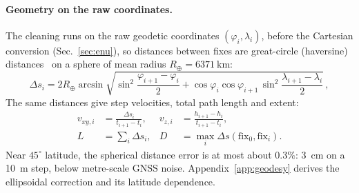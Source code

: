 \paragraph{Geometry on the raw coordinates.}
The cleaning runs on the raw geodetic coordinates $(\varphi_i,\lambda_i)$, before the
Cartesian conversion (Sec.~\ref{sec:enu}), so distances between fixes are great-circle
(haversine) distances~\cite{sklearn_haversine} on a sphere of mean radius
$R_\oplus=\SI{6371}{\kilo\metre}$:
\begin{equation}
\label{eq:haversine}
\Delta s_i = 2R_\oplus\arcsin\sqrt{\sin^2\!\frac{\varphi_{i+1}-\varphi_i}{2}
  + \cos\varphi_i\cos\varphi_{i+1}\,\sin^2\!\frac{\lambda_{i+1}-\lambda_i}{2}}\,,
\end{equation}
The same distances give step velocities, total path length and extent:
\begin{equation}
\begin{aligned}
 v_{xy,i}&=\frac{\Delta s_i}{t_{i+1}-t_i}, &
 v_{z,i}&=\frac{h_{i+1}-h_i}{t_{i+1}-t_i},\\
 L&=\sum_i\Delta s_i, &
 D&=\max_i\Delta s(\mathrm{fix}_0,\mathrm{fix}_i).
\end{aligned}
\label{eq:raw-track-geometry}
\end{equation}
Near $45^\circ$ latitude, the spherical distance error is at most about $0.3\%$:
\SI{3}{\centi\metre} on a \SI{10}{\metre} step, below metre-scale GNSS noise.
Appendix~\ref{app:geodesy} derives the ellipsoidal correction and its latitude dependence.

